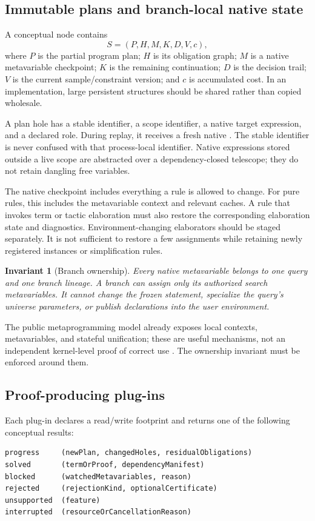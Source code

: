 \documentclass[11pt,a4paper]{article}
\newcommand{\code}[1]{\texttt{\detokenize{#1}}}
\newtheorem{invariant}[definition]{Invariant}
\theoremstyle{remark}
\begin{document}
\subsection{Immutable plans and branch-local native state}

A conceptual node contains
\[
 S=(P,H,M,K,D,V,c),
\]
where $P$ is the partial program plan; $H$ is its obligation graph; $M$ is a native metavariable checkpoint; $K$ is the remaining continuation; $D$ is the decision trail; $V$ is the current sample/constraint version; and $c$ is accumulated cost. In an implementation, large persistent structures should be shared rather than copied wholesale.

A plan hole has a stable identifier, a scope identifier, a native target expression, and a declared role. During replay, it receives a fresh native \code{MVarId}. The stable identifier is never confused with that process-local identifier. Native expressions stored outside a live scope are abstracted over a dependency-closed telescope; they do not retain dangling free variables.

The native checkpoint includes everything a rule is allowed to change. For pure \code{MetaM} rules, this includes the metavariable context and relevant caches. A rule that invokes term or tactic elaboration must also restore the corresponding elaboration state and diagnostics. Environment-changing elaborators should be staged separately. It is not sufficient to restore a few assignments while retaining newly registered instances or simplification rules.

\begin{invariant}[Branch ownership]
Every native metavariable belongs to one query and one branch lineage. A branch can assign only its authorized search metavariables. It cannot change the frozen statement, specialize the query's universe parameters, or publish declarations into the user environment.
\end{invariant}

The public metaprogramming model already exposes local contexts, metavariables, and stateful unification; these are useful mechanisms, not an independent kernel-level proof of correct use \cite{meta-book}. The ownership invariant must be enforced around them.

\subsection{Proof-producing plug-ins}

Each plug-in declares a read/write footprint and returns one of the following conceptual results:
\begin{lstlisting}
progress     (newPlan, changedHoles, residualObligations)
solved       (termOrProof, dependencyManifest)
blocked      (watchedMetavariables, reason)
rejected     (rejectionKind, optionalCertificate)
unsupported  (feature)
interrupted  (resourceOrCancellationReason)
\end{lstlisting}
\end{document}
